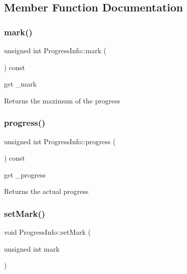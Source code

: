 \subsection{Member Function Documentation}
\mbox{\label{class_progress_info_a9d81184d13006d316c5c46133b7ff409}} 
\subsubsection{\texorpdfstring{mark()}{mark()}}
{\footnotesize\ttfamily unsigned int Progress\+Info\+::mark (\begin{DoxyParamCaption}{ }\end{DoxyParamCaption}) const}



get \+\_\+mark 

\begin{DoxyReturn}{Returns}
the maximum of the progress 
\end{DoxyReturn}
\mbox{\label{class_progress_info_a0cf245dd88d85029da4952e1f74acc0f}} 
\subsubsection{\texorpdfstring{progress()}{progress()}}
{\footnotesize\ttfamily unsigned int Progress\+Info\+::progress (\begin{DoxyParamCaption}{ }\end{DoxyParamCaption}) const}



get \+\_\+progress 

\begin{DoxyReturn}{Returns}
the actual progress 
\end{DoxyReturn}
\mbox{\label{class_progress_info_ac67672902957c1cd4629d33ed1d76e81}} 
\subsubsection{\texorpdfstring{set\+Mark()}{setMark()}}
{\footnotesize\ttfamily void Progress\+Info\+::set\+Mark (\begin{DoxyParamCaption}\item[{unsigned int}]{mark }\end{DoxyParamCaption})}



